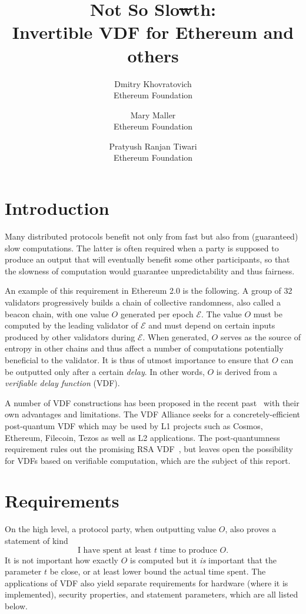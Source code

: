 \documentclass{article}
\title{Not So Slo\sout{w}th:\\  Invertible VDF for Ethereum and others}
\author{Dmitry Khovratovich\\Ethereum Foundation \and Mary Maller\\Ethereum Foundation \and Pratyush Ranjan Tiwari\\Ethereum Foundation}
\begin{document}
\maketitle

\tableofcontents

\section{Introduction}

Many distributed protocols benefit not only from fast but also from (guaranteed) slow computations. The latter is often required when a party is supposed to produce an output that will eventually benefit some other participants, so that the slowness of computation would guarantee unpredictability and thus fairness.

An example of this requirement in Ethereum 2.0 is the following. A group of 32 validators progressively builds a chain of collective randomness, also called a beacon chain, with one value $O$ generated per epoch $\mathcal{E}$. The value $O$ must be computed by the leading validator of $\mathcal{E}$ and must depend on certain inputs produced by other validators during $\mathcal{E}$. When generated, $O$ serves as the source of entropy in other chains and thus affect a number of computations potentially beneficial to the validator. It is thus of utmost importance to ensure that $O$ can be outputted only after a certain \emph{delay}. In other words, $O$ is derived from a \emph{verifiable delay function} (VDF).

A number of VDF constructions has been proposed in the recent past~\cite{DBLP:journals/ijact/LenstraW17,DBLP:conf/eurocrypt/Wesolowski19,DBLP:conf/crypto/BonehBBF18,DBLP:conf/innovations/Pietrzak19a} with their own advantages and limitations.
The VDF Alliance seeks for a concretely-efficient post-quantum VDF which may be used by L1 projects such as Cosmos, Ethereum, Filecoin, Tezos as well as L2 applications. The post-quantumness requirement rules out the promising RSA VDF~\cite{DBLP:conf/eurocrypt/Wesolowski19,DBLP:conf/innovations/Pietrzak19a}, but leaves open the possibility for VDFs based on verifiable computation, which are the subject of this report.

\section{Requirements}

On the high level, a protocol party, when outputting value $O$, also proves a statement of kind
$$
\text{I have spent at least $t$ time to produce }O.
$$
It is not important how exactly $O$ is computed but it \emph{is} important that the parameter $t$ be close, or at least  lower bound the actual time spent. The applications of VDF also yield separate requirements for hardware (where it is implemented), security properties, and statement parameters, which are all listed below.
\end{document}
